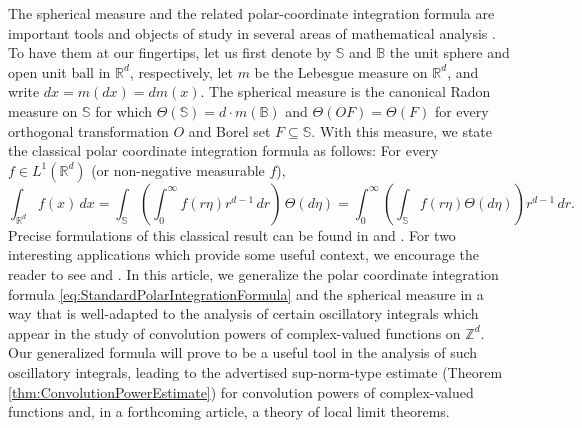 \documentclass[11pt]{article}
\theoremstyle{remark}
\begin{document}
The spherical measure and the related polar-coordinate integration formula are important tools and objects of study in several areas of mathematical analysis \cite{stein_harmonic_1993, baker_integration_1997,helms_potential_2009}. To have them at our fingertips, let us first denote by $\mathbb{S}$ and $\mathbb{B}$ the unit sphere and open unit ball in $\mathbb{R}^d$, respectively, let $m$ be the Lebesgue measure on $\mathbb{R}^d$, and write $dx=m(dx)=dm(x)$. The spherical measure is the canonical Radon measure on $\mathbb{S}$ for which $\Theta(\mathbb{S})=d\cdot m(\mathbb{B})$ and $\Theta(OF)=\Theta(F)$ for every orthogonal transformation $O$ and Borel set $F\subseteq\mathbb{S}$. With this measure, we state the classical polar coordinate integration formula as follows: For every $f\in L^1(\mathbb{R}^d)$ (or non-negative measurable $f$),
\begin{equation}\label{eq:StandardPolarIntegrationFormula}
\int_{\mathbb{R}^d}f(x)\,dx=\int_{\mathbb{S}}\left(\int_0^\infty f(r\eta)r^{d-1}\,dr\right)\,\Theta(d\eta)=\int_0^\infty\left(\int_\mathbb{S}f(r\eta)\Theta(d\eta)\right)r^{d-1}\,dr.
\end{equation}
Precise formulations of this classical result can be found in \cite{stein_real_2009} and \cite{folland_real_2013}. For two interesting applications which provide some useful context, we encourage the reader to see \cite{baker_integration_1997} and \cite{folland_how_2001}.  In this article, we generalize the polar coordinate integration formula \eqref{eq:StandardPolarIntegrationFormula} and the spherical measure in a way that is well-adapted to the analysis of certain oscillatory integrals which appear in the study of convolution powers of complex-valued functions on $\mathbb{Z}^d$. Our generalized formula will prove to be a useful tool in the analysis of such oscillatory integrals, leading to the advertised sup-norm-type estimate (Theorem \ref{thm:ConvolutionPowerEstimate}) for convolution powers of complex-valued functions and, in a forthcoming article, a theory of local limit theorems.\\ 
\end{document}
